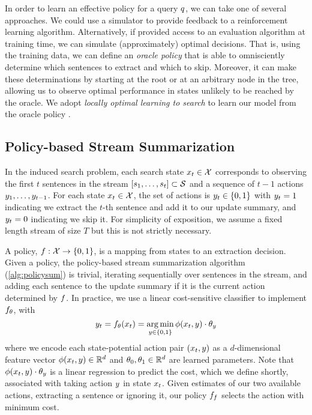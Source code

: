 In order to learn an effective policy for a query $q$, we can take one of
several approaches.  We could use a simulator to provide feedback to a
reinforcement learning algorithm.  Alternatively, if provided access to an
evaluation algorithm at training time, we can simulate (approximately) optimal
decisions. That is, using the training data, we can define an \emph{oracle
policy} that is able to omnisciently determine which sentences to extract and
which to skip.  Moreover, it can make these determinations by starting at the
root or at an arbitrary node in the tree, allowing us to observe optimal
performance in states unlikely to be reached by the oracle.  We adopt
\textit{locally optimal learning to search} to learn our model from the oracle
policy \citep{chang2015}.  

\subsection{Policy-based Stream Summarization}

In the induced search problem, each search state $x_t \in \mathcal{X}$
corresponds to observing the first $t$ sentences in the stream $\left[
s_1,\ldots, s_t \right] \subset \mathcal{S}$ and a sequence of $t-1$
actions $y_1, \ldots, y_{t-1}$.  For each state $x_t \in \mathcal{X}$,
the set of actions is $y_t \in \{0,1\}$ with $y_t =1$ indicating we
extract the $t$-th sentence and add it to our update summary, and $y_t = 0$
indicating we skip it. For simplicity of exposition, we assume a fixed length
stream of size $T$ but this is not strictly necessary. 



A policy, $f : \mathcal{X} \rightarrow \{0,1\}$, is a mapping from states to
an extraction decision. Given a policy, the policy-based stream summarization
algorithm (\autoref{alg:policysum}) is trivial, iterating sequentially over
sentences in the stream, and adding each sentence to the update summary if it
is the current action determined by $f$.  In practice, we use a linear
cost-sensitive classifier to implement $f_{\theta}$, with \[ y_t =
f_{\theta}(x_t) = \operatorname*{arg\,min}_{y \in \{0,1\}} \phi(x_t,
y)\cdot \theta_y\] where we encode each state-potential action pair
$(x_t,y)$ as a $d$-dimensional feature vector  $\phi(x_t, y)
\in \mathbb{R}^d$ and $\theta_0, \theta_1 \in \mathbb{R}^{d}$ are learned
parameters.  Note that $\phi(x_t,y)\cdot \theta_y$ is a linear
regression to predict the cost, which we define shortly, associated with taking
action $y$ in state $x_t$. Given estimates of our two available
actions, extracting a sentence or ignoring it, our policy $f_f$
selects the action with minimum cost.

